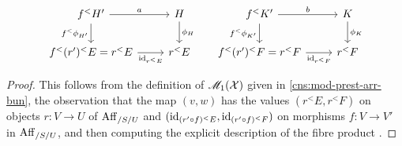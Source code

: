 \documentclass[11pt]{amsart}
\begin{document}
\begin{prop}
\begin{itemize}
\begin{itemize}
\[    \begin{tikzcd}
    f^<H' \ar[r, "a"] \ar[d, "f^<\phi_{H'}" left] & H \ar[d, "\phi_H"] \\
    f^<(r')^<E = r^<E \ar[r, "\id_{r^<E}" below] & r^<E
    \end{tikzcd}\hspace{1.5em}
    \begin{tikzcd}
    f^<K' \ar[r, "b"] \ar[d, "f^<\phi_{K'}" left] & K \ar[d, "\phi_K"] \\
    f^<(r')^<F = r^<F \ar[r, "\id_{r^<F}" below] & r^<F
    \end{tikzcd}\]
  \end{itemize}
\end{itemize}
\end{prop}
\begin{proof}
This follows from the definition of $\mathscr{M}_1(\mathcal{X})$ given in
\cref{cns:mod-prest-arr-bun}, the observation that the map $(v, w)$
has the values $(r^<E, r^<F)$ on objects $r : V \to U$ of $\mathrm{Aff}_{/S/U}$ and
$(\mathrm{id}_{(r' \circ f)^<E}, \mathrm{id}_{(r' \circ f)^<F})$ on morphisms $f : V \to V'$ in
$\mathrm{Aff}_{/S/U}$, and then computing the explicit description of the fibre product
\cite[\href{https://stacks.math.columbia.edu/tag/0040}{Lemma 0040}]
{stacks-project}.
\end{proof}
\end{document}
